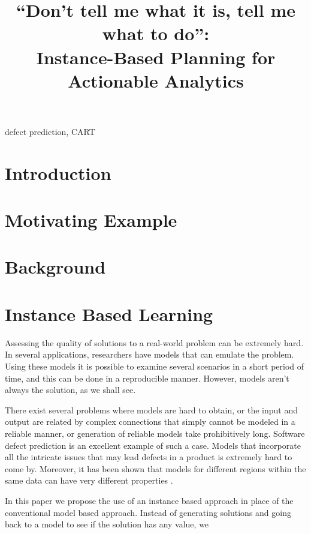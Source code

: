 \documentclass[conference]{IEEEtran}
\begin{document}
  \title{``Don't tell me what it is, tell me what to do'':\\Instance-Based Planning for Actionable Analytics}
  
  \maketitle
  
  
  \begin{abstract}
 
  \end{abstract}
  \begin{IEEEkeywords}
    defect prediction, CART
  \end{IEEEkeywords}
  
\section{Introduction}
\section{Motivating Example}
\section{Background}
\section{Instance Based Learning}

Assessing the quality of solutions to a real-world problem can be extremely hard. In several applications, researchers have models that can emulate the problem. Using these models it is possible to examine several scenarios in a short period of time, and this can be done in a reproducible manner. However, models aren't always the solution, as we shall see. 

There exist several problems where models are hard to obtain, or the input and output are related by complex connections that simply cannot be modeled in a reliable manner, or generation of reliable models take prohibitively long. Software defect prediction is an excellent example of such a case. Models that incorporate all the intricate issues that may lead defects in a product is extremely hard to come by. Moreover, it has been shown that models for different regions within the same data can have very different properties \cite{localvsglobal}. 

In this paper we propose the use of an instance based approach in place of the conventional model based approach. Instead of generating solutions and going back to a model to see if the solution has any value, we 
\end{document}

